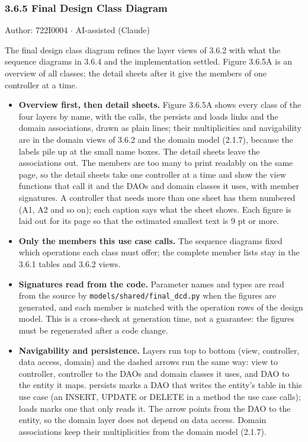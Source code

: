 \subsubsection*{3.6.5 Final Design Class Diagram}
Author: 722I0004 \ensuremath{\cdot} AI-assisted (Claude)

The final design class diagram refines the layer views of 3.6.2 with what the sequence diagrams in 3.6.4 and the implementation settled. Figure 3.6.5A is an overview of all classes; the detail sheets after it give the members of one controller at a time.

\begin{itemize}
\item \textbf{Overview first, then detail sheets.} Figure 3.6.5A shows every class of the four layers by name, with the calls, the \guillemotleft{}persists\guillemotright{} and \guillemotleft{}loads\guillemotright{} links and the domain associations, drawn as plain lines; their multiplicities and navigability are in the domain views of 3.6.2 and the domain model (2.1.7), because the labels pile up at the small name boxes. The detail sheets leave the associations out. The members are too many to print readably on the same page, so the detail sheets take one controller at a time and show the view functions that call it and the DAOs and domain classes it uses, with member signatures. A controller that needs more than one sheet has them numbered (A1, A2 and so on); each caption says what the sheet shows. Each figure is laid out for its page so that the estimated smallest text is 9 pt or more.

\item \textbf{Only the members this use case calls.} The sequence diagrams fixed which operations each class must offer; the complete member lists stay in the 3.6.1 tables and 3.6.2 views.

\item \textbf{Signatures read from the code.} Parameter names and types are read from the source by \texttt{models/\allowbreak{}shared/\allowbreak{}final\_\allowbreak{}dcd.\allowbreak{}py} when the figures are generated, and each member is matched with the operation rows of the design model. This is a cross-check at generation time, not a guarantee: the figures must be regenerated after a code change.

\item \textbf{Navigability and persistence.} Layers run top to bottom (view, controller, data access, domain) and the dashed arrows run the same way: view to controller, controller to the DAOs and domain classes it uses, and DAO to the entity it maps. \guillemotleft{}persists\guillemotright{} marks a DAO that writes the entity's table in this use case (an INSERT, UPDATE or DELETE in a method the use case calls); \guillemotleft{}loads\guillemotright{} marks one that only reads it. The arrow points from the DAO to the entity, so the domain layer does not depend on data access. Domain associations keep their multiplicities from the domain model (2.1.7).

\end{itemize}
